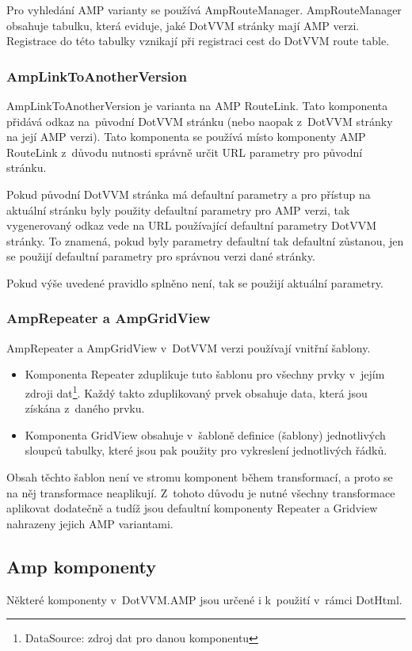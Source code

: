 Pro vyhledání AMP varianty se používá AmpRouteManager. AmpRouteManager obsahuje tabulku, která eviduje, jaké DotVVM stránky mají AMP verzi. Registrace do této tabulky vznikají při registraci cest do DotVVM route table.

\subsubsection*{AmpLinkToAnotherVersion}
AmpLinkToAnotherVersion je varianta na AMP RouteLink. Tato komponenta přidává odkaz na~původní DotVVM stránku (nebo naopak z~DotVVM stránky na její AMP verzi). Tato komponenta se používá místo komponenty AMP RouteLink z~důvodu nutnosti správně určit URL parametry pro původní stránku.

Pokud původní DotVVM stránka má defaultní parametry a pro přístup na aktuální stránku byly použity defaultní parametry pro AMP verzi, tak vygenerovaný odkaz vede na URL používající defaultní parametry DotVVM stránky. To znamená, pokud byly parametry defaultní tak defaultní zůstanou, jen se použijí defaultní parametry pro správnou verzi dané stránky.

Pokud výše uvedené pravidlo splněno není, tak se použijí aktuální parametry.

\subsubsection*{AmpRepeater a AmpGridView}
AmpRepeater a AmpGridView v~DotVVM verzi používají vnitřní šablony.

\begin{itemize}
    \item Komponenta Repeater zduplikuje tuto šablonu pro všechny prvky v~jejím zdroji dat\footnote{DataSource: zdroj dat pro danou komponentu}. Každý takto zduplikovaný prvek obsahuje data, která jsou získána z~daného prvku.
    \item Komponenta GridView obsahuje v~šabloně definice (šablony) jednotlivých sloupců tabulky, které jsou pak použity pro vykreslení jednotlivých řádků.
\end{itemize}

Obsah těchto šablon není ve stromu komponent během transformací, a proto se na něj transformace neaplikují. Z~tohoto důvodu je nutné všechny transformace aplikovat dodatečně a tudíž jsou defaultní komponenty Repeater a Gridview nahrazeny jejich AMP variantami.

\subsection*{Amp komponenty}
 Některé komponenty v~DotVVM.AMP jsou určené i k~použití v~rámci DotHtml.
